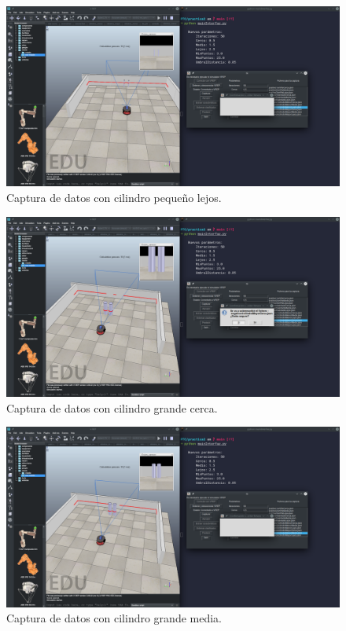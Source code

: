 \documentclass[12pt, spanish]{article}
\begin{document}
\begin{figure}[H]
    \centering
    \includegraphics[width=\textwidth]{cilindro_p_lejos.png}
    \caption{Captura de datos con cilindro pequeño lejos.}
\end{figure}

\begin{figure}[H]
    \centering
    \includegraphics[width=\textwidth]{cilindro_m_cerca.png}
    \caption{Captura de datos con cilindro grande cerca.}
\end{figure}

\begin{figure}[H]
    \centering
    \includegraphics[width=\textwidth]{cilindro_m_media.png}
    \caption{Captura de datos con cilindro grande media.}
\end{figure}
\end{document}
